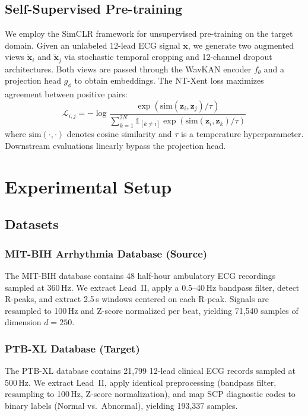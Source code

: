 \documentclass[journal,twoside,web]{ieeecolor}
\begin{document}
\subsection{Self-Supervised Pre-training}
We employ the SimCLR framework \cite{chen2020simple} for unsupervised pre-training on the target domain. Given an unlabeled 12-lead ECG signal $\mathbf{x}$, we generate two augmented views $\tilde{\mathbf{x}}_i$ and $\tilde{\mathbf{x}}_j$ via stochastic temporal cropping and 12-channel dropout architectures. Both views are passed through the WavKAN encoder $f_\theta$ and a projection head $g_\phi$ to obtain embeddings. The NT-Xent loss maximizes agreement between positive pairs:
\begin{equation}
    \mathcal{L}_{i,j} = -\log \frac{\exp(\text{sim}(\mathbf{z}_i, \mathbf{z}_j) / \tau)}{\sum_{k=1}^{2N} \mathbb{1}_{[k \neq i]} \exp(\text{sim}(\mathbf{z}_i, \mathbf{z}_k) / \tau)}
\end{equation}
where $\text{sim}(\cdot, \cdot)$ denotes cosine similarity and $\tau$ is a temperature hyperparameter. Downstream evaluations linearly bypass the projection head.

\section{Experimental Setup}

\subsection{Datasets}

\subsubsection{MIT-BIH Arrhythmia Database (Source)}
The MIT-BIH database \cite{moody2001impact} contains 48 half-hour ambulatory ECG recordings sampled at 360\,Hz. We extract Lead~II, apply a 0.5--40\,Hz bandpass filter, detect R-peaks, and extract 2.5\,s windows centered on each R-peak. Signals are resampled to 100\,Hz and Z-score normalized per beat, yielding 71,540 samples of dimension $d = 250$.

\subsubsection{PTB-XL Database (Target)}
The PTB-XL database \cite{wagner2020ptbxl} contains 21,799 12-lead clinical ECG records sampled at 500\,Hz. We extract Lead~II, apply identical preprocessing (bandpass filter, resampling to 100\,Hz, Z-score normalization), and map SCP diagnostic codes to binary labels (Normal vs.\ Abnormal), yielding 193,337 samples.
\end{document}
